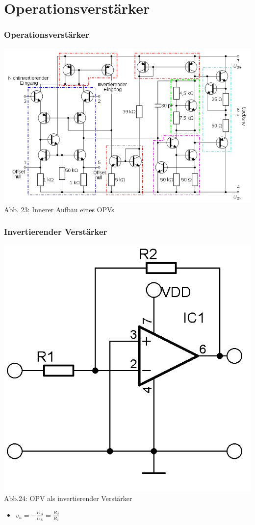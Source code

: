\section*{Operationsverstärker}


\begin{frame}
\frametitle{Operationsverstärker}
\begin{center}
	\includegraphics[scale=0.35]{a06/OPV-intern.png}\\
	Abb. 23: Innerer Aufbau eines OPVs \cite{wp}
\end{center}
\end{frame}

\begin{frame}
\frametitle{Invertierender Verstärker}
	\begin{center}
	\includegraphics[scale=1]{a06/OPV-Inverter.png}\\
	Abb.24: OPV als invertierender Verstärker
	\end{center}
	\begin{itemize}
		\item	$v_u = -\frac{U_A}{U_E} = \frac{R_2}{R_1}$
	\end{itemize}
\end{frame}

